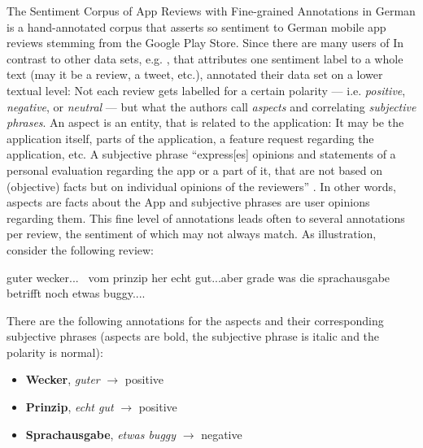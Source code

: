 The Sentiment Corpus of App Reviews with Fine-grained Annotations in German \cite{sanger2016scare} 
is a hand-annotated corpus that asserts so sentiment to German mobile app reviews stemming from 
the Google Play Store.
Since there are many users of 
In contrast to other data sets, e.g. \citep{socher2013recursive, go2009twitter}, that attributes 
one sentiment label to a whole text (may it be a review, a tweet, etc.), \cite{sanger2016scare} 
annotated their data set on a lower textual level:
Not each review gets labelled for a certain polarity --- i.e. \emph{positive}, \emph{negative}, or 
\emph{neutral} --- but what the authors call \emph{aspects} and correlating \emph{subjective 
phrases}.
An aspect is an entity, that is related to the application:
It may be the application itself, parts of the application, a feature request regarding the 
application, etc.
A subjective phrase ``express[es] opinions and statements of a personal evaluation regarding the 
app or a part of it, that are not based on (objective) facts but on individual opinions of the 
reviewers'' \citep[p.~1116]{sanger2016scare}.
In other words, aspects are facts about the App and subjective phrases are user opinions regarding 
them.
This fine level of annotations leads often to several annotations per review, the sentiment of 
which may not always match.
As illustration, consider the following review:

\begin{examples}
	\label{ex:fine-grained-anno}
	\item guter wecker... \textbar\textbar\ vom prinzip her echt gut...aber grade was die sprachausgabe betrifft noch etwas buggy....
\end{examples}

There are the following annotations for the aspects and their corresponding subjective phrases 
(aspects are bold, the subjective phrase is italic and the polarity is normal):


\begin{itemize}
	\item \textbf{Wecker}, \textit{guter} $\rightarrow$ positive
	\item \textbf{Prinzip}, \textit{echt gut} $\rightarrow$ positive
	\item \textbf{Sprachausgabe}, \textit{etwas buggy} $\rightarrow$ negative
\end{itemize}

